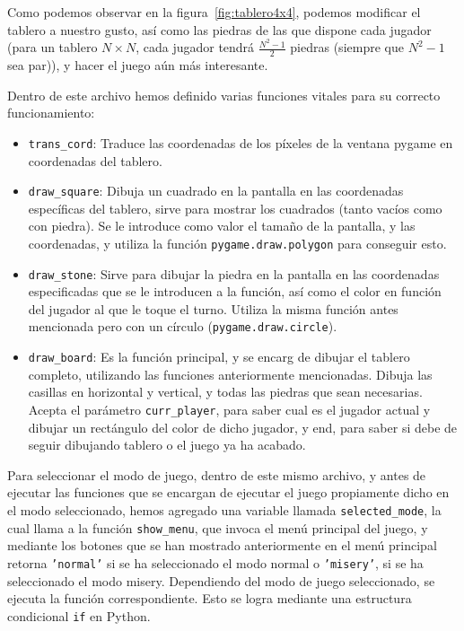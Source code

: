 \documentclass[a4paper,12pt]{article}
\begin{document}
\vspace{\baselineskip}
Como podemos observar en la figura~\ref{fig:tablero4x4}, podemos modificar el tablero a nuestro gusto, así como las piedras de las que dispone cada jugador (para un tablero
$N \times N$, cada jugador tendrá $\frac{N^2 - 1}{2}$ piedras (siempre que $N^2 -1$ sea par)), y hacer el juego aún más interesante.

\vspace{\baselineskip}
Dentro de este archivo hemos definido varias funciones vitales para su correcto funcionamiento:
\begin{itemize}
    \item \texttt{trans\_cord}: Traduce las coordenadas de los píxeles de la ventana pygame en coordenadas del tablero.
    \item \texttt{draw\_square}: Dibuja un cuadrado en la pantalla en las coordenadas específicas del tablero, sirve para mostrar los cuadrados (tanto vacíos
    como con piedra). Se le introduce como valor el tamaño de la pantalla, y las coordenadas, y utiliza la función \texttt{pygame.draw.polygon} para conseguir esto.
    \item \texttt{draw\_stone}: Sirve para dibujar la piedra en la pantalla en las coordenadas especificadas que se le introducen a la función, así como el color en 
    función del jugador al que le toque el turno. Utiliza la misma función antes mencionada pero con un círculo (\texttt{pygame.draw.circle}).
    \item \texttt{draw\_board}: Es la función principal, y se encarg de dibujar el tablero completo, utilizando las funciones anteriormente mencionadas. Dibuja las casillas
    en horizontal y vertical, y todas las piedras que sean necesarias. Acepta el parámetro \texttt{curr\_player}, para saber cual es el jugador actual y dibujar un rectángulo 
    del color de dicho jugador, y end, para saber si debe de seguir dibujando tablero o el juego ya ha acabado.
\end{itemize}

\vspace{\baselineskip}
Para seleccionar el modo de juego, dentro de este mismo archivo, y antes de ejecutar las funciones que se encargan de ejecutar el juego propiamente dicho en el modo seleccionado,
hemos agregado una variable llamada \texttt{selected\_mode}, la cual llama a la función \texttt{show\_menu}, que invoca el menú principal del juego, y mediante los botones que se 
han mostrado anteriormente en el menú principal retorna \texttt{'normal'} si se ha seleccionado el modo normal o \texttt{'misery'}, si se ha seleccionado el modo misery.
Dependiendo del modo de juego seleccionado, se ejecuta la función correspondiente. Esto se logra mediante una estructura condicional \texttt{if} en Python.
\end{document}
